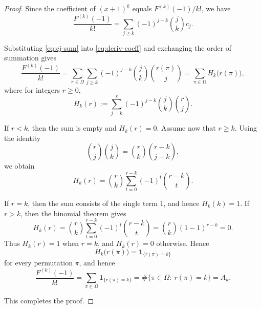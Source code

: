 \documentclass[10pt,a4paper]{amsart}
\begin{document}
\begin{proof}
Since the coefficient of \((x+1)^k\) equals
\(F^{(k)}(-1)/k!\), we have
\begin{equation}\label{eq:deriv-coeff}
\frac{F^{(k)}(-1)}{k!}
=
\sum_{j\ge k}
(-1)^{j-k}
\binom{j}{k}
c_j.
\end{equation}

Substituting \eqref{eq:cj-sum} into
\eqref{eq:deriv-coeff} and exchanging the order of summation gives
\[
\frac{F^{(k)}(-1)}{k!}
=
\sum_{\pi\in\Omega}
\sum_{j\ge k}
(-1)^{j-k}
\binom{j}{k}
\binom{r(\pi)}{j}
=
\sum_{\pi\in\Omega}
H_k\!\bigl(r(\pi)\bigr),
\]
where for integers \(r\ge0\),
\[
H_k(r)
:=
\sum_{j=k}^{r}
(-1)^{j-k}
\binom{j}{k}
\binom{r}{j}.
\]

If \(r<k\), then the sum is empty and \(H_k(r)=0\).
Assume now that \(r\ge k\).
Using the identity
\[
\binom{r}{j}\binom{j}{k}
=
\binom{r}{k}\binom{r-k}{j-k},
\]
we obtain
\[
H_k(r)
=
\binom{r}{k}
\sum_{t=0}^{r-k}
(-1)^t
\binom{r-k}{t}.
\]

If \(r=k\), then the sum consists of the single term \(1\), and hence
\(
H_k(k)=1.
\)
If \(r>k\), then the binomial theorem gives
\[
H_k(r)
=
\binom{r}{k}
\sum_{t=0}^{r-k}
(-1)^t\binom{r-k}{t}
=
\binom{r}{k}(1-1)^{r-k}
=
0.
\]
Thus \(H_k(r)=1\) when \(r=k\), and \(H_k(r)=0\) otherwise.
Hence
\[
H_k\!\bigl(r(\pi)\bigr)
=
\mathbf 1_{\{r(\pi)=k\}}
\]
for every permutation \(\pi\), and hence
\[
\frac{F^{(k)}(-1)}{k!}
=
\sum_{\pi\in\Omega}
\mathbf 1_{\{r(\pi)=k\}}
=
\#\{\pi\in\Omega:\ r(\pi)=k\}
=
A_k.
\]

This completes the proof.
\end{proof}
\end{document}
